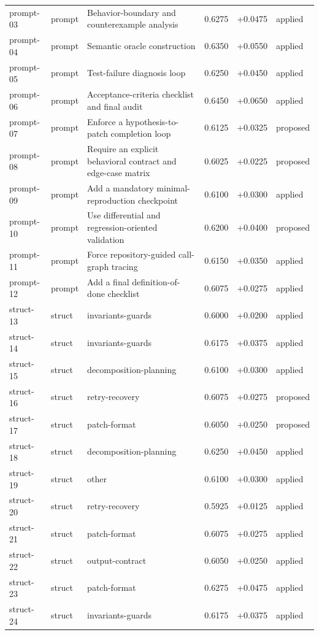 \begin{center}
\begin{longtable}{llp{5.2cm}rrl}
prompt-03 & prompt & Behavior-boundary and counterexample analysis & 0.6275 & +0.0475 & applied \\
prompt-04 & prompt & Semantic oracle construction & 0.6350 & +0.0550 & applied \\
prompt-05 & prompt & Test-failure diagnosis loop & 0.6250 & +0.0450 & applied \\
prompt-06 & prompt & Acceptance-criteria checklist and final audit & 0.6450 & +0.0650 & applied \\
prompt-07 & prompt & Enforce a hypothesis-to-patch completion loop & 0.6125 & +0.0325 & proposed \\
prompt-08 & prompt & Require an explicit behavioral contract and edge-case matrix & 0.6025 & +0.0225 & proposed \\
prompt-09 & prompt & Add a mandatory minimal-reproduction checkpoint & 0.6100 & +0.0300 & applied \\
prompt-10 & prompt & Use differential and regression-oriented validation & 0.6200 & +0.0400 & proposed \\
prompt-11 & prompt & Force repository-guided call-graph tracing & 0.6150 & +0.0350 & applied \\
prompt-12 & prompt & Add a final definition-of-done checklist & 0.6075 & +0.0275 & applied \\
struct-13 & struct & invariants-guards & 0.6000 & +0.0200 & applied \\
struct-14 & struct & invariants-guards & 0.6175 & +0.0375 & applied \\
struct-15 & struct & decomposition-planning & 0.6100 & +0.0300 & applied \\
struct-16 & struct & retry-recovery & 0.6075 & +0.0275 & proposed \\
struct-17 & struct & patch-format & 0.6050 & +0.0250 & proposed \\
struct-18 & struct & decomposition-planning & 0.6250 & +0.0450 & applied \\
struct-19 & struct & other & 0.6100 & +0.0300 & applied \\
struct-20 & struct & retry-recovery & 0.5925 & +0.0125 & applied \\
struct-21 & struct & patch-format & 0.6075 & +0.0275 & applied \\
struct-22 & struct & output-contract & 0.6050 & +0.0250 & applied \\
struct-23 & struct & patch-format & 0.6275 & +0.0475 & applied \\
struct-24 & struct & invariants-guards & 0.6175 & +0.0375 & applied \\

\end{longtable}
\end{center}

